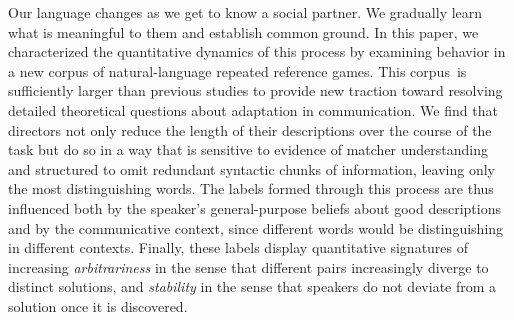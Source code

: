 \documentclass[alpha-refs]{wiley-article}
\begin{document}
Our language changes as we get to know a social partner.
We gradually learn what is meaningful to them and establish common ground.
In this paper, we characterized the quantitative dynamics of this process by examining behavior in a new corpus of natural-language repeated reference games.
This corpus is sufficiently larger than previous studies to provide new traction toward resolving detailed theoretical questions about adaptation in communication.
We find that directors not only reduce the length of their descriptions over the course of the task but do so in a way that is sensitive to evidence of matcher understanding and structured to omit redundant syntactic chunks of information, leaving only the most distinguishing words.
The labels formed through this process are thus influenced both by the speaker's general-purpose beliefs about good descriptions and by the communicative context, since different words would be distinguishing in different contexts. %
Finally, these labels display quantitative signatures of increasing \emph{arbitrariness} in the sense that different pairs increasingly diverge to distinct solutions, and \emph{stability} in the sense that speakers do not deviate from a solution once it is discovered.
\end{document}
